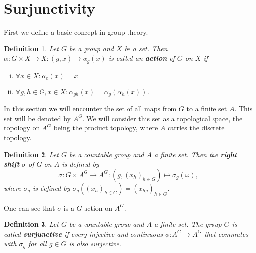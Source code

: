 \documentclass[titlepage, a4paper]{article}
\newtheorem{definition}{Definition}
\theoremstyle{remark}
\begin{document}
 

    \section{Surjunctivity}\label{sec:surjunctivity}

    First we define a basic concept in group theory.

    \begin{definition} %
	    Let $G$ be a group and $X$ be a set. Then $\alpha: G \times X \to X: (g,x) \mapsto \alpha_g(x)$ is called an \textbf{action} of $G$ on $X$ if
        \begin{enumerate}[(i)]
            \item $\forall x \in X: \alpha_e(x) = x$
            \item $\forall g,h \in G, x\in X: \alpha_{gh}(x) = \alpha_g(\alpha_h(x))$.
        \end{enumerate}
    \end{definition}

    In this section we will encounter the set of all maps from $G$ to a finite set $A$. This set will be denoted by $A^G$. We will consider this set as a topological space, the topology on $A^G$ being the product topology, where $A$ carries the discrete topology.

    \begin{definition}
	    Let $G$ be a countable group and $A$ a finite set. Then the \textbf{right shift} $\sigma$ of $G$ on $A$ is defined by
        \[
        \sigma: G \times A^G \to A^G: \left(g, (x_{h})_{h \in G} \right) \mapsto \sigma_g(\omega),
        \]
        where $\sigma_g$ is defined by $\sigma_g\left( (x_{h})_{h \in G} \right) = \left( x_{hg} \right)_{h \in G}$. %
    \end{definition}

    One can see that $\sigma$ is a $G$-action on $A^G$.
    \begin{definition}
	    Let $G$ be a countable group and $A$ a finite set. The group $G$ is called \textbf{surjunctive} if every injective and continuous $\phi: A^{G}\to A^{G}$ that commutes with $\sigma_g$ for all $g \in G$ is also surjective.
    \end{definition}
\end{document}

